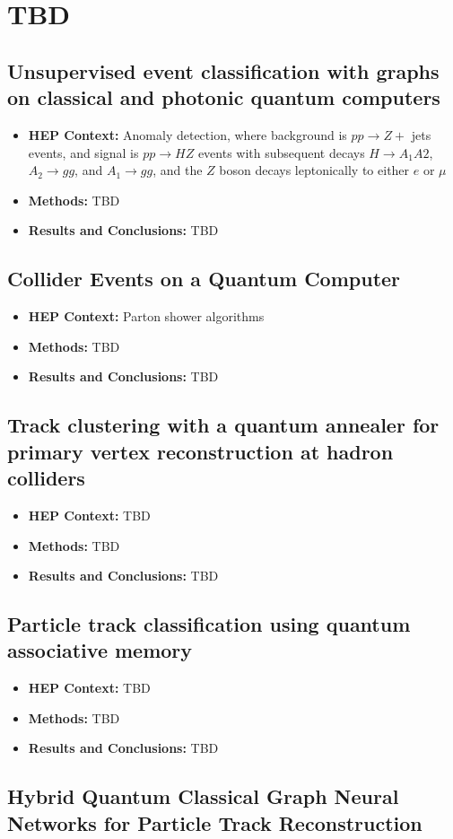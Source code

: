 \section{TBD}

\subsection{Unsupervised event classification with graphs on classical and photonic quantum computers~\cite{Blance:2020ktp}}
\begin{itemize}
	\item \textbf{HEP Context: }Anomaly detection, where background is $pp \rightarrow Z +$ jets events, and signal is $pp \rightarrow HZ$ events with subsequent decays $H \rightarrow A_1 A2$, $A_2 \rightarrow gg$, and $A_1 \rightarrow gg$, and the $Z$ boson decays leptonically to either $e$ or $\mu$
	\item \textbf{Methods: }TBD
	\item \textbf{Results and Conclusions: }TBD
\end{itemize}\subsection{Collider Events on a Quantum Computer~\cite{Gustafson:2022xwt}}
\begin{itemize}
	\item \textbf{HEP Context: }Parton shower algorithms
	\item \textbf{Methods: }TBD
	\item \textbf{Results and Conclusions: }TBD
\end{itemize}\subsection{Track clustering with a quantum annealer for primary vertex reconstruction at hadron colliders~\cite{Das:2019hrw}}
\begin{itemize}
	\item \textbf{HEP Context: }TBD
	\item \textbf{Methods: }TBD
	\item \textbf{Results and Conclusions: }TBD
\end{itemize}\subsection{Particle track classification using quantum associative memory~\cite{Quiroz:2020jmp}}
\begin{itemize}
	\item \textbf{HEP Context: }TBD
	\item \textbf{Methods: }TBD
	\item \textbf{Results and Conclusions: }TBD
\end{itemize}\subsection{Hybrid Quantum Classical Graph Neural Networks for Particle Track Reconstruction~\cite{Tuysuz:2021oai}}
